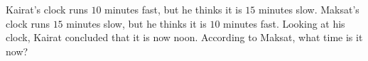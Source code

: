 Kairat's clock runs $10$ minutes fast, but he thinks it is $15$ minutes slow. Maksat's clock runs $15$ minutes slow, but he thinks it is $10$ minutes fast. Looking at his clock, Kairat concluded that it is now noon. According to Maksat, what time is it now?
